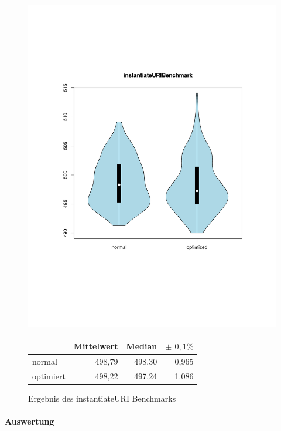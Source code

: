 \begin{figure}[H]
{		\includegraphics[trim=20mm 60mm 0mm 50mm,scale=0.50]{pictures/vioplot_instantiateURI.pdf}
	}

	\begin{table}[H]
	\centering
		\begin{tabular}{|l|r|r|r|}
			\hline
		   		 	  & Mittelwert & Median & \bf{$\pm$ $0,1\%$} \\
		 	\hline
		 	\hline
		  	normal 	  & 498,79 & 498,30 & 0,965 \\
		 	optimiert & 498,22 & 497,24 & 1.086 \\ 
		  	\hline
		  	
		\end{tabular}
	\end{table}

	\caption{Ergebnis des instantiateURI Benchmarks}\label{bp:instURIBench}
\end{figure}

\paragraph{Auswertung}

